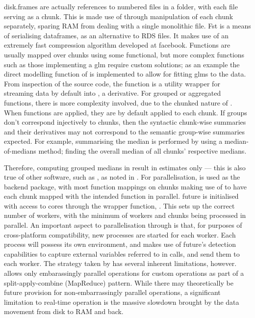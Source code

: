 disk.frames are actually references to numbered  files in a
folder, with each file serving as a chunk.
This is made use of through manipulation of each chunk separately,
sparing RAM from dealing with a single monolithic
file\cite{zj19:_inges_data}.
Fst is a means of serialising dataframes, as an alternative to RDS
files\cite{klik19}.
It makes use of an extremely fast compression algorithm developed at
facebook.
Functions are usually mapped over chunks using some functional, but more
complex functions such as those implementing a glm require custom
solutions; as an example the direct modelling function of
 is implemented to allow
for fitting glms to the data.
From inspection of the source code, the function is a utility wrapper
for streaming  data by default into , a 
derivative.
For grouped or aggregated functions, there is more complexity involved,
due to the chunked nature of .
When functions are applied, they are by default applied to each chunk.
If groups don't correspond injectively to chunks, then the syntactic
chunk-wise summaries and their derivatives may not correspond to the
semantic group-wise summaries expected.
For example, summarising the median is performed by using a
median-of-medians method; finding the overall median of all chunks'
respective medians.

Therefore, computing grouped medians in  result in estimates
only --- this is also true of other software, such as , as noted in
\cite{zj19:_group_by}.
For parallelisation,  is used as the backend package, with most
function mappings on chunks making use of
to have each chunk mapped with the intended function in parallel.
future is initialised with access to cores through the wrapper function,
\cite{zj19:_key}.
This sets up the correct number of workers, with the minimum of workers
and chunks being processed in parallel.
An important aspect to parallelisation through  is that, for
purposes of cross-platform compatibility, new \R processes are started
for each worker\cite{zj19:_using}.
Each process will possess its own environment, and  makes use
of future's detection capabilities to capture external variables
referred to in calls, and send them to each worker.
The strategy taken by  has several inherent
limitations, however.  allows only embarassingly
parallel operations for custom operations as part of a
split-apply-combine (MapReduce) pattern.
While there may theoretically be future provision for non-embarrassingly
parallel operations, a significant limitation to real-time operation is
the massive slowdown brought by the data movement from disk to RAM and
back.

